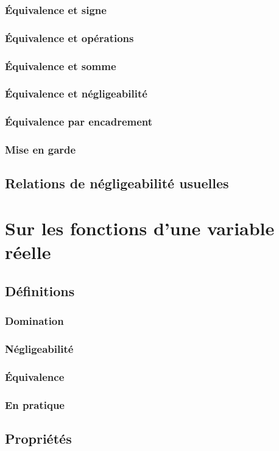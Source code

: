 \documentclass[12pt,a4paper,french]{book}
\begin{document}
			\subsubsection{Équivalence et signe}
			\subsubsection{Équivalence et opérations}
			\subsubsection{Équivalence et somme}
			\subsubsection{Équivalence et négligeabilité}
			\subsubsection{Équivalence par encadrement}
			\subsubsection{Mise en garde}
		\subsection{Relations de négligeabilité usuelles}
	\section{Sur les fonctions d'une variable réelle}
		\subsection{Définitions}
			\subsubsection{Domination}
			\subsubsection{Négligeabilité}
			\subsubsection{Équivalence}
			\subsubsection{En pratique}
		\subsection{Propriétés}
\end{document}
